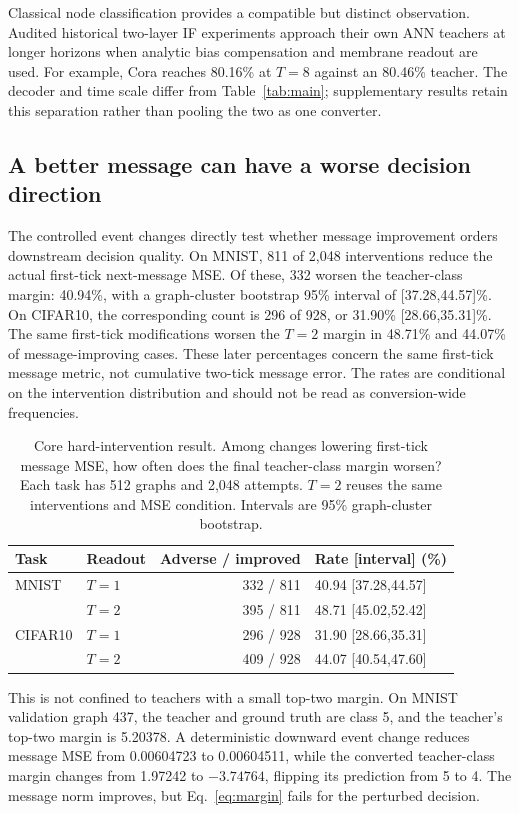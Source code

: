 \documentclass[10pt,twocolumn,letterpaper]{article}
\begin{document}
Classical node classification provides a compatible but distinct observation. Audited historical two-layer IF experiments approach their own ANN teachers at longer horizons when analytic bias compensation and membrane readout are used. For example, Cora reaches 80.16\% at $T=8$ against an 80.46\% teacher. The decoder and time scale differ from Table~\ref{tab:main}; supplementary results retain this separation rather than pooling the two as one converter.

\subsection{A better message can have a worse decision direction}
The controlled event changes directly test whether message improvement orders downstream decision quality. On MNIST, 811 of 2,048 interventions reduce the actual first-tick next-message MSE. Of these, 332 worsen the teacher-class margin: 40.94\%, with a graph-cluster bootstrap 95\% interval of [37.28,44.57]\%. On CIFAR10, the corresponding count is 296 of 928, or 31.90\% [28.66,35.31]\%. The same first-tick modifications worsen the $T=2$ margin in 48.71\% and 44.07\% of message-improving cases. These later percentages concern the same first-tick message metric, not cumulative two-tick message error. The rates are conditional on the intervention distribution and should not be read as conversion-wide frequencies.

\begin{table}[t]
\caption{Core hard-intervention result. Among changes lowering first-tick message MSE, how often does the final teacher-class margin worsen? Each task has 512 graphs and 2,048 attempts. $T=2$ reuses the same interventions and MSE condition. Intervals are 95\% graph-cluster bootstrap.}
\label{tab:hard}\centering\small\setlength{\tabcolsep}{3pt}
\begin{tabular}{llrl}\toprule
Task & Readout & Adverse / improved & Rate [interval] (\%)\\\midrule
MNIST & $T=1$ & 332 / 811 & 40.94 [37.28,44.57]\\
 & $T=2$ & 395 / 811 & 48.71 [45.02,52.42]\\
CIFAR10 & $T=1$ & 296 / 928 & 31.90 [28.66,35.31]\\
 & $T=2$ & 409 / 928 & 44.07 [40.54,47.60]\\\bottomrule
\end{tabular}\end{table}

This is not confined to teachers with a small top-two margin. On MNIST validation graph 437, the teacher and ground truth are class 5, and the teacher's top-two margin is 5.20378. A deterministic downward event change reduces message MSE from 0.00604723 to 0.00604511, while the converted teacher-class margin changes from 1.97242 to $-3.74764$, flipping its prediction from 5 to 4. The message norm improves, but Eq.~\eqref{eq:margin} fails for the perturbed decision.
\end{document}
